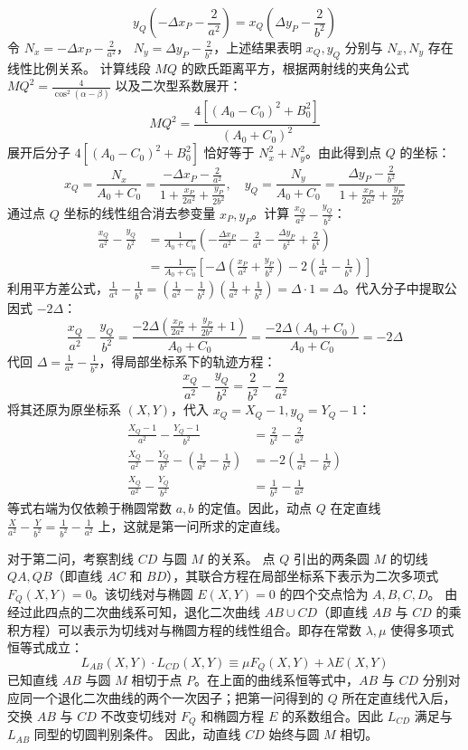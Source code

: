 \begin{solution}
$$y_Q \left( -\Delta x_P - \frac{2}{a^2} \right) = x_Q \left( \Delta y_P - \frac{2}{b^2} \right)$$
令 $N_x = -\Delta x_P - \frac{2}{a^2}$， $N_y = \Delta y_P - \frac{2}{b^2}$，上述结果表明 $x_Q, y_Q$ 分别与 $N_x, N_y$ 存在线性比例关系。
计算线段 $MQ$ 的欧氏距离平方，根据两射线的夹角公式 $MQ^2 = \frac{4}{\cos^2(\alpha-\beta)}$ 以及二次型系数展开：
$$MQ^2 = \frac{4[(A_0 - C_0)^2 + B_0^2]}{(A_0 + C_0)^2}$$
展开后分子 $4[(A_0 - C_0)^2 + B_0^2]$ 恰好等于 $N_x^2 + N_y^2$。由此得到点 $Q$ 的坐标：
$$x_Q = \frac{N_x}{A_0 + C_0} = \frac{-\Delta x_P - \frac{2}{a^2}}{1 + \frac{x_P}{2a^2} + \frac{y_P}{2b^2}}, \quad y_Q = \frac{N_y}{A_0 + C_0} = \frac{\Delta y_P - \frac{2}{b^2}}{1 + \frac{x_P}{2a^2} + \frac{y_P}{2b^2}}$$
通过点 $Q$ 坐标的线性组合消去参变量 $x_P, y_P$。计算 $\frac{x_Q}{a^2} - \frac{y_Q}{b^2}$：
\begin{align*}
\frac{x_Q}{a^2} - \frac{y_Q}{b^2} &= \frac{1}{A_0 + C_0} \left( -\frac{\Delta x_P}{a^2} - \frac{2}{a^4} - \frac{\Delta y_P}{b^2} + \frac{2}{b^4} \right) \\
&= \frac{1}{A_0 + C_0} \left[ -\Delta \left( \frac{x_P}{a^2} + \frac{y_P}{b^2} \right) - 2 \left( \frac{1}{a^4} - \frac{1}{b^4} \right) \right]
\end{align*}
利用平方差公式，$\frac{1}{a^4} - \frac{1}{b^4} = \left(\frac{1}{a^2} - \frac{1}{b^2}\right)\left(\frac{1}{a^2} + \frac{1}{b^2}\right) = \Delta \cdot 1 = \Delta$。代入分子中提取公因式 $-2\Delta$：
$$\frac{x_Q}{a^2} - \frac{y_Q}{b^2} = \frac{-2\Delta \left( \frac{x_P}{2a^2} + \frac{y_P}{2b^2} + 1 \right)}{A_0 + C_0} = \frac{-2\Delta (A_0 + C_0)}{A_0 + C_0} = -2\Delta$$
代回 $\Delta = \frac{1}{a^2} - \frac{1}{b^2}$，得局部坐标系下的轨迹方程：
$$\frac{x_Q}{a^2} - \frac{y_Q}{b^2} = \frac{2}{b^2} - \frac{2}{a^2}$$
将其还原为原坐标系 $(X, Y)$，代入 $x_Q = X_Q - 1, y_Q = Y_Q - 1$：
\begin{align*}
\frac{X_Q - 1}{a^2} - \frac{Y_Q - 1}{b^2} &= \frac{2}{b^2} - \frac{2}{a^2} \\
\frac{X_Q}{a^2} - \frac{Y_Q}{b^2} - \left(\frac{1}{a^2} - \frac{1}{b^2}\right) &= -2\left(\frac{1}{a^2} - \frac{1}{b^2}\right) \\
\frac{X_Q}{a^2} - \frac{Y_Q}{b^2} &= \frac{1}{b^2} - \frac{1}{a^2}
\end{align*}
等式右端为仅依赖于椭圆常数 $a, b$ 的定值。因此，动点 $Q$ 在定直线 $\frac{X}{a^2} - \frac{Y}{b^2} = \frac{1}{b^2} - \frac{1}{a^2}$ 上，这就是第一问所求的定直线。

对于第二问，考察割线 $CD$ 与圆 $M$ 的关系。
点 $Q$ 引出的两条圆 $M$ 的切线 $QA, QB$（即直线 $AC$ 和 $BD$），其联合方程在局部坐标系下表示为二次多项式 $F_Q(X, Y) = 0$。该切线对与椭圆 $E(X,Y) = 0$ 的四个交点恰为 $A, B, C, D$。
由经过此四点的二次曲线系可知，退化二次曲线 $AB \cup CD$（即直线 $AB$ 与 $CD$ 的乘积方程）可以表示为切线对与椭圆方程的线性组合。即存在常数 $\lambda, \mu$ 使得多项式恒等式成立：
$$L_{AB}(X, Y) \cdot L_{CD}(X, Y) \equiv \mu F_Q(X, Y) + \lambda E(X, Y)$$
已知直线 $AB$ 与圆 $M$ 相切于点 $P$。在上面的曲线系恒等式中，$AB$ 与 $CD$ 分别对应同一个退化二次曲线的两个一次因子；把第一问得到的 $Q$ 所在定直线代入后，交换 $AB$ 与 $CD$ 不改变切线对 $F_Q$ 和椭圆方程 $E$ 的系数组合。因此 $L_{CD}$ 满足与 $L_{AB}$ 同型的切圆判别条件。
因此，动直线 $CD$ 始终与圆 $M$ 相切。
\end{solution}

